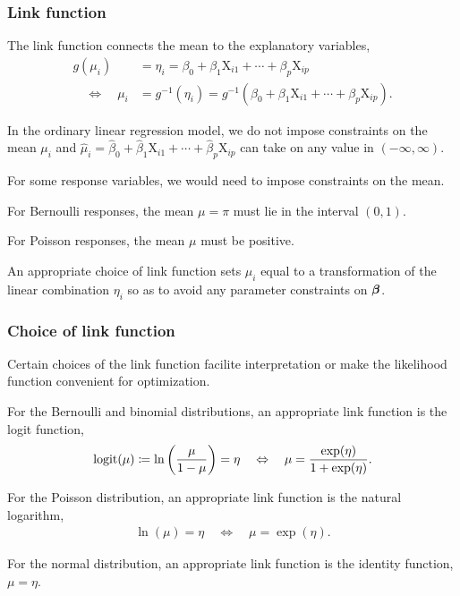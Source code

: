 \documentclass{beamer}
\begin{document}
\begin{frame}
\frametitle{Link function}
\medskip

\bi
\item The \alert{link function} connects the mean to the explanatory variables, 
\small{
\begin{align*}
g(\mu_i) & = \eta_i = \beta_0 + \beta_1 \mathrm{X}_{i1} + \cdots + \beta_p \mathrm{X}_{ip} \\
\quad \Leftrightarrow \quad \mu_i & = g^{-1}(\eta_i) = g^{-1}(\beta_0 + \beta_1 \mathrm{X}_{i1} + \cdots + \beta_p \mathrm{X}_{ip}).
\end{align*}
}
\item In the ordinary linear regression model, we do not impose constraints on the mean $\mu_i$ and $\hat{\mu}_i = \hat{\beta}_0 + \hat{\beta}_1 \mathrm{X}_{i1} + \cdots + \hat{\beta}_p \mathrm{X}_{ip}$ can take on any value in $(-\infty, \infty)$. 
\item For some response variables, we would need to impose constraints on the mean.
\bi
 
\item For Bernoulli responses, the mean $\mu=\pi$ must lie in the interval $(0, 1)$.
\item For Poisson responses, the mean $\mu$ must be positive.
\ei
\item An appropriate choice of link function sets $\mu_i$ equal to a transformation of the linear combination $\eta_i$ so as to avoid any parameter constraints on $\boldsymbol {\beta}$.
\ei
\end{frame}

\begin{frame}
\frametitle{Choice of link function}

Certain choices of the link function facilite interpretation or make the likelihood function convenient for optimization.  
\bi
\item For the Bernoulli and binomial distributions, an appropriate link function is the \alert{logit} function, 
\begin{align*}
\operatorname{logit}(\mu)\coloneqq  
\ln \left( \frac{\mu}{1-\mu} \right) = \eta \quad \Leftrightarrow \quad \mu = \frac{\exp(\eta)}{1+\exp(\eta)}.
\end{align*}

\item For the Poisson distribution, an appropriate link function is the \alert{natural logarithm},
\begin{align*}
\ln (\mu) = \eta  \quad \Leftrightarrow \quad \mu = \exp(\eta).                                                  \end{align*}

\item For the normal distribution, an appropriate link function is the \alert{identity} function, $\mu = \eta$.

\ei
\end{frame}
\end{document}

